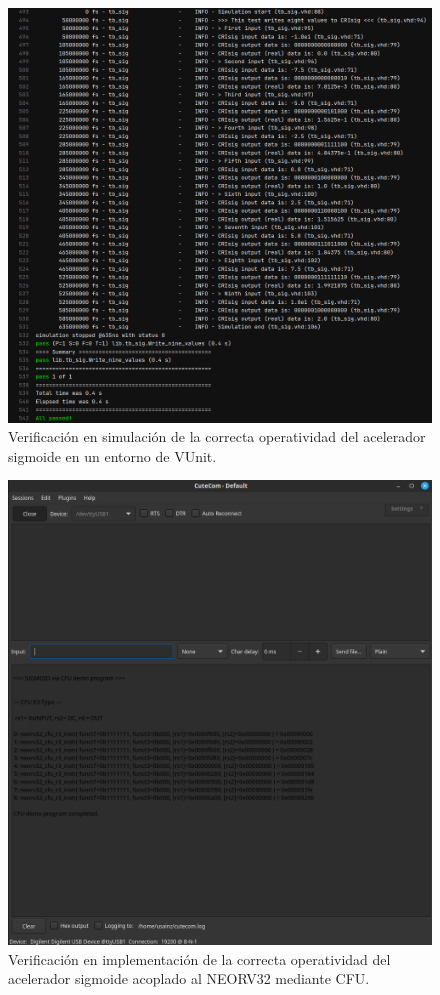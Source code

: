 \begin{figure}[H]
    \centering
    \includegraphics[width=14cm]{Figuras/sim_sig_alone.png}
    \caption{Verificación en simulación de la correcta operatividad del acelerador sigmoide en un entorno de VUnit.}
    \label{fig:sim_alone}
\end{figure}

\begin{figure}[H]
    \centering
    \includegraphics[width=14cm]{Figuras/sig_cfu.png}
    \caption{Verificación en implementación de la correcta operatividad del acelerador sigmoide acoplado al NEORV32 mediante CFU.}
    \label{fig:impl_complex}
\end{figure}

